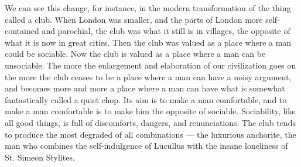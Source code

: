 We can see this change, for instance, in the modern transformation of the thing called a club. When London was smaller, and the parts of London more self-contained and parochial, the club was what it still is in villages, the opposite of what it is now in great cities. Then the club was valued as a place where a man could be sociable. Now the club is valued as a place where a man can be unsociable. The more the enlargement and elaboration of our civilization goes on the more the club ceases to be a place where a man can have a noisy argument, and becomes more and more a place where a man can have what is somewhat fantastically called a quiet chop. Its aim is to make a man comfortable, and to make a man comfortable is to make him the opposite of sociable. Sociability, like all good things, is full of discomforts, dangers, and renunciations. The club tends to produce the most degraded of all combinations — the luxurious anchorite, the man who combines the self-indulgence of Lucullus with the insane loneliness of St. Simeon Stylites.

